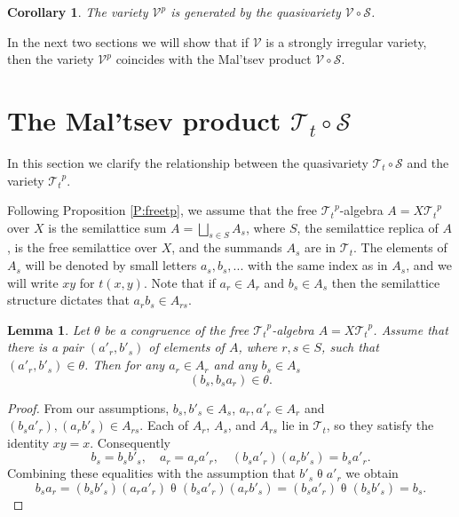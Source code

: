 \documentclass{birkau}
\newcommand{\mcV}{\mathcal{V}}
\newcommand{\mcT}{\mathcal{T}}
\newcommand{\mcS}{\mathcal{S}}
\newcommand{\pro}[1]{{#1}^p}
\theoremstyle{plain}
\newtheorem{corollary}[theorem]{Corollary}
\newtheorem{lemma}[theorem]{Lemma}
\theoremstyle{definition}
\numberwithin{equation}{section}
\begin{document}
\begin{corollary}\label{C:gen}
The variety $\pro{\mcV}$ is generated by the quasivariety $\mcV \circ \mcS$.
\end{corollary}

In the next two sections we will show that if $\mcV$ is a strongly irregular variety, then the
variety $\pro{\mcV}$ coincides with the Mal'tsev product $\mcV \circ \mcS$.

\section{The Mal'tsev product $\mcT_t \circ \mcS$}\label{S:Tt}

In this section we clarify the relationship between the quasivariety
$\mcT_t \circ \mcS$ and the variety $ \pro{\mcT_t}$.

Following Proposition \ref{P:freetp}, we assume that the free $\pro{\mcT_t}$-algebra
$A = X\pro{\mcT_t}$ over $X$ is the semilattice sum $A = \bigsqcup_{s \in S} A_s $, where
$S$, the semilattice replica of $A$, is the free semilattice over $X$, and the summands
$A_s$ are in $\mcT_t$. The elements of $A_s$ will be denoted by small letters
$a_s, b_s, ...$ with the same index as in $A_s$, and we will write $xy$ for $t(x,y)$. Note
that if $a_r \in A_r$ and $b_s \in A_s$ then the semilattice structure dictates that $a_r
b_s \in A_{rs}$.

\begin{lemma}\label{L:congrfree}
Let $\theta$ be a congruence of the free $\pro{\mcT_t}$-algebra $A =
X\pro{\mcT_t}$. Assume that there is a pair $(a'_r, b'_s)$ of elements of $A$, where $r, s
\in S$, such that $(a'_r, b'_s) \in \theta$. Then for any $a_r \in A_r$ and any $b_s \in
A_s$
\begin{equation*}
(b_s , b_s a_r) \in \theta.
\end{equation*}

\end{lemma}
\begin{proof}

From our assumptions, $b_s, b'_s \in A_s$, $a_r, a'_r \in A_r$ and $(b_sa'_r), (a_r b'_s) \in
A_{rs}$. Each of $A_r$, $A_s$, and $A_{rs}$ lie in $\mcT_t$, so they satisfy the identity
$xy=x$. Consequently
\begin{equation*}
  b_s = b_s b'_s, \quad a_r = a_r a'_r, \quad (b_sa'_r)(a_rb'_s) = b_sa'_r.
\end{equation*}
Combining these equalities with the assumption that $b'_s \mathrel{\theta} a'_r$ we obtain
\begin{equation*}
  b_s a_r = (b_sb'_s)(a_ra'_r) \mathrel{\theta} (b_sa'_r)(a_rb'_s) = (b_s a'_r)
  \mathrel{\theta} (b_s b'_s) = b_s.
\end{equation*}
\end{proof}
\end{document}
